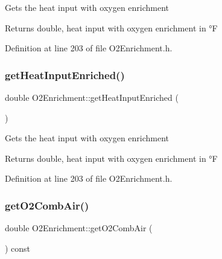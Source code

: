 Gets the heat input with oxygen enrichment \begin{DoxyReturn}{Returns}
double, heat input with oxygen enrichment in °F 
\end{DoxyReturn}


Definition at line 203 of file O2\+Enrichment.\+h.

\mbox{\label{class_o2_enrichment_ac1d74fe5a8791b9a8bc596bcb19b8b1e}} 
\subsubsection{\texorpdfstring{get\+Heat\+Input\+Enriched()}{getHeatInputEnriched()}\hspace{0.1cm}{\footnotesize\ttfamily [3/3]}}
{\footnotesize\ttfamily double O2\+Enrichment\+::get\+Heat\+Input\+Enriched (\begin{DoxyParamCaption}{ }\end{DoxyParamCaption})\hspace{0.3cm}{\ttfamily [inline]}}

Gets the heat input with oxygen enrichment \begin{DoxyReturn}{Returns}
double, heat input with oxygen enrichment in °F 
\end{DoxyReturn}


Definition at line 203 of file O2\+Enrichment.\+h.

\mbox{\label{class_o2_enrichment_a52953d4a55fd9e4d91030fe96d800f71}} 
\subsubsection{\texorpdfstring{get\+O2\+Comb\+Air()}{getO2CombAir()}\hspace{0.1cm}{\footnotesize\ttfamily [1/3]}}
{\footnotesize\ttfamily double O2\+Enrichment\+::get\+O2\+Comb\+Air (\begin{DoxyParamCaption}{ }\end{DoxyParamCaption}) const\hspace{0.3cm}{\ttfamily [inline]}}

